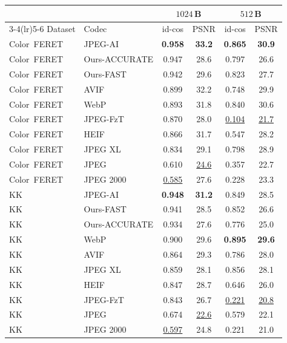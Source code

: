 \begin{tabular}{llcccc}
\toprule
& & \multicolumn{2}{c}{$1024$\,B} & \multicolumn{2}{c}{$512$\,B} \\
\cmidrule(lr){3-4}\cmidrule(lr){5-6}
Dataset & Codec & id-cos & PSNR & id-cos & PSNR \\
\midrule
Color~FERET & JPEG-AI & \cellcolor{green!25}\textbf{0.958} & \cellcolor{green!25}\textbf{33.2} & \cellcolor{green!25}\textbf{0.865} & \cellcolor{green!25}\textbf{30.9} \\
Color~FERET & Ours-ACCURATE & 0.947 & 28.6 & 0.797 & 26.6 \\
Color~FERET & Ours-FAST & 0.942 & 29.6 & 0.823 & 27.7 \\
Color~FERET & AVIF & 0.899 & 32.2 & 0.748 & 29.9 \\
Color~FERET & WebP & 0.893 & 31.8 & 0.840 & 30.6 \\
Color~FERET & JPEG-FzT & 0.870 & 28.0 & \cellcolor{red!22}\underline{0.104} & \cellcolor{red!22}\underline{21.7} \\
Color~FERET & HEIF & 0.866 & 31.7 & 0.547 & 28.2 \\
Color~FERET & JPEG XL & 0.834 & 29.1 & 0.798 & 28.9 \\
Color~FERET & JPEG & 0.610 & \cellcolor{red!22}\underline{24.6} & 0.357 & 22.7 \\
Color~FERET & JPEG 2000 & \cellcolor{red!22}\underline{0.585} & 27.6 & 0.228 & 23.3 \\
\midrule
KK & JPEG-AI & \cellcolor{green!25}\textbf{0.948} & \cellcolor{green!25}\textbf{31.2} & 0.849 & 28.5 \\
KK & Ours-FAST & 0.941 & 28.5 & 0.852 & 26.6 \\
KK & Ours-ACCURATE & 0.934 & 27.6 & 0.776 & 25.0 \\
KK & WebP & 0.900 & 29.6 & \cellcolor{green!25}\textbf{0.895} & \cellcolor{green!25}\textbf{29.6} \\
KK & AVIF & 0.864 & 29.3 & 0.786 & 28.0 \\
KK & JPEG XL & 0.859 & 28.1 & 0.856 & 28.1 \\
KK & HEIF & 0.847 & 28.7 & 0.646 & 26.0 \\
KK & JPEG-FzT & 0.843 & 26.7 & \cellcolor{red!22}\underline{0.221} & \cellcolor{red!22}\underline{20.8} \\
KK & JPEG & 0.674 & \cellcolor{red!22}\underline{22.6} & 0.579 & 22.1 \\
KK & JPEG 2000 & \cellcolor{red!22}\underline{0.597} & 24.8 & 0.221 & 21.0 \\
\bottomrule
\end{tabular}
